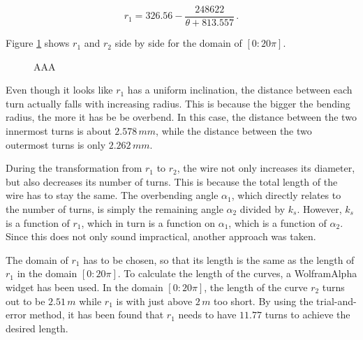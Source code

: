 \begin{equation}
    r_1 = 326.56 - \frac{248622}{\theta + 813.557}\,.
\end{equation}

Figure \ref{fig:spirals} shows \(r_1\) and \(r_2\) side by side for the domain of \([0:20\pi]\).

\begin{figure}[h!]
    \centering
    \caption{AAA}
    \label{fig:spirals}
\end{figure}

Even though it looks like \(r_1\) has a uniform inclination, the distance between each turn actually falls with increasing radius. This is because the bigger the bending radius, the more it has be be overbend. In this case, the distance between the two innermost turns is about \(2.578\,mm\), while the distance between the two outermost turns is only \(2.262\,mm\).

During the transformation from \(r_1\) to \(r_2\), the wire not only increases its diameter, but also decreases its number of turns. This is because the total length of the wire has to stay the same. The overbending angle \(\alpha_1\), which directly relates to the number of turns, is simply the remaining angle \(\alpha_2\) divided by \(k_s\). However, \(k_s\) is a function of \(r_1\), which in turn is a function on \(\alpha_1\), which is a function of \(\alpha_2\). Since this does not only sound impractical, another approach was taken.

The domain of \(r_1\) has to be chosen, so that its length is the same as the length of \(r_1\) in the domain \([0:20\pi]\). To calculate the length of the curves, a WolframAlpha widget has been used. In the domain \([0:20\pi]\), the length of the curve \(r_2\) turns out to be \(2.51\,m\) while \(r_1\) is with just above \(2\,m\) too short. By using the trial-and-error method, it has been found that \(r_1\) needs to have \(11.77\) turns to achieve the desired length.

